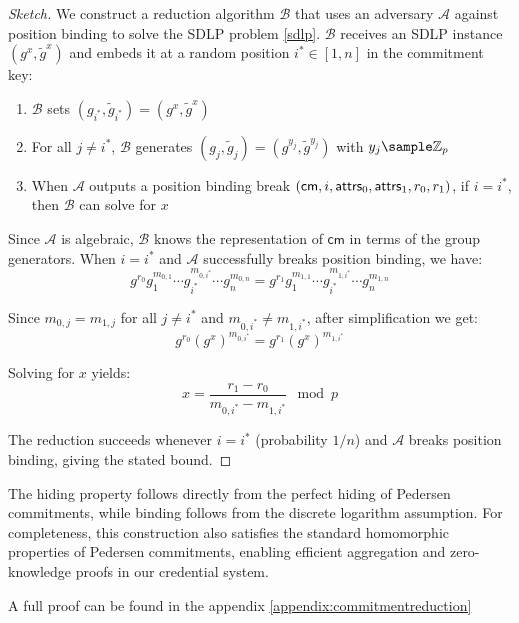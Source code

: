 \begin{proof}[Sketch]
We construct a reduction algorithm $\mathcal{B}$ that uses an adversary $\mathcal{A}$ against position binding to solve the SDLP problem \ref{sdlp}. $\mathcal{B}$ receives an SDLP instance $(g^x, \tilde{g}^x)$ and embeds it at a random position $i^* \in [1,n]$ in the commitment key:

\begin{enumerate}
    \item $\mathcal{B}$ sets $(g_{i^*}, \tilde{g}_{i^*}) = (g^x, \tilde{g}^x)$
    \item For all $j \neq i^*$, $\mathcal{B}$ generates $(g_j, \tilde{g}_j) = (g^{y_j}, \tilde{g}^{y_j})$ with $y_j \sample \Z_p$
    \item When $\mathcal{A}$ outputs a position binding break $(\mathsf{cm}, i, \mathsf{attrs}_0, \mathsf{attrs}_1, r_0, r_1)$, if $i = i^*$, then $\mathcal{B}$ can solve for $x$
\end{enumerate}

Since $\mathcal{A}$ is algebraic, $\mathcal{B}$ knows the representation of $\mathsf{cm}$ in terms of the group generators. When $i = i^*$ and $\mathcal{A}$ successfully breaks position binding, we have:
\[
    g^{r_0}g_1^{m_{0,1}}\cdots g_{i^*}^{m_{0,i^*}}\cdots g_n^{m_{0,n}} = g^{r_1}g_1^{m_{1,1}}\cdots g_{i^*}^{m_{1,i^*}}\cdots g_n^{m_{1,n}}
\]

Since $m_{0,j} = m_{1,j}$ for all $j \neq i^*$ and $m_{0,i^*} \neq m_{1,i^*}$, after simplification we get:
\[
    g^{r_0} (g^x)^{m_{0,i^*}} = g^{r_1} (g^x)^{m_{1,i^*}}
\]

Solving for $x$ yields:
\[
    x = \frac{r_1 - r_0}{m_{0,i^*} - m_{1,i^*}} \mod p
\]

The reduction succeeds whenever $i = i^*$ (probability $1/n$) and $\mathcal{A}$ breaks position binding, giving the stated bound.
\end{proof}

The hiding property follows directly from the perfect hiding of Pedersen commitments, while binding follows from the discrete logarithm assumption. For completeness, this construction also satisfies the standard homomorphic properties of Pedersen commitments, enabling efficient aggregation and zero-knowledge proofs in our credential system.

A full proof can be found in the appendix \ref{appendix:commitmentreduction}

% 
% 
















